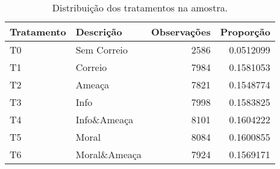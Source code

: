 \begin{table}[H]

\caption{\label{tab:descritivas1}Distribuição dos tratamentos na amostra.}
\centering
\begin{tabular}[t]{llrr}
\toprule
Tratamento & Descrição & Observações & Proporção\\
\midrule
T0 & Sem Correio & 2586 & 0.0512099\\
T1 & Correio & 7984 & 0.1581053\\
T2 & Ameaça & 7821 & 0.1548774\\
T3 & Info & 7998 & 0.1583825\\
T4 & Info\&Ameaça & 8101 & 0.1604222\\
\addlinespace
T5 & Moral & 8084 & 0.1600855\\
T6 & Moral\&Ameaça & 7924 & 0.1569171\\
\bottomrule
\end{tabular}
\end{table}
